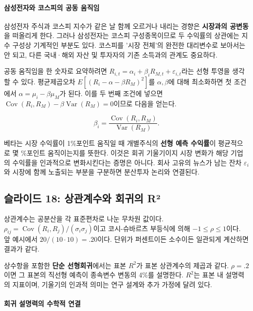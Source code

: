 \documentclass[11pt,a4paper]{article}
\begin{document}
\paragraph{삼성전자와 코스피의 공동 움직임}

삼성전자 주식과 코스피 지수가 같은 날 함께 오르거나 내리는 경향은 \textbf{시장과의 공변동}을 떠올리게 한다. 그러나 삼성전자는 코스피 구성종목이므로 두 수익률의 상관에는 지수 구성상 기계적인 부분도 있다. 코스피를 '시장 전체'의 완전한 대리변수로 보아서는 안 되고, 다른 국내·해외 자산 및 투자자의 기존 소득과의 관계도 중요하다.
\par

공동 움직임을 한 숫자로 요약하려면 $R_{i,t}=\alpha_i+\beta_iR_{M,t}+\varepsilon_{i,t}$라는 선형 투영을 생각할 수 있다. 평균제곱오차 $E[(R_i-\alpha-\beta R_M)^2]$를 $\alpha,\beta$에 대해 최소화하면 첫 조건에서 $\alpha=\mu_i-\beta\mu_M$가 된다. 이를 두 번째 조건에 넣으면 $\operatorname{Cov}(R_i,R_M)-\beta\operatorname{Var}(R_M)=0$이므로 다음을 얻는다.
\par

\[
\beta_i=\frac{\operatorname{Cov}(R_i,R_M)}{\operatorname{Var}(R_M)}.
\]

베타는 시장 수익률이 1\%포인트 움직일 때 개별주식의 \textbf{선형 예측 수익률}이 평균적으로 몇 \%포인트 움직이는지를 뜻한다. 이것은 회귀 기울기이지 시장 변화가 해당 기업의 수익률을 인과적으로 변화시킨다는 증명은 아니다. 회사 고유의 뉴스가 남는 잔차 $\varepsilon_i$와 시장에 함께 노출되는 부분을 구분하면 분산투자 논리와 연결된다.
\par

\subsection{슬라이드 18: 상관계수와 회귀의 R²}

상관계수는 공분산을 각 표준편차로 나눈 무차원 값이다. $\rho_{ij}=\operatorname{Cov}(R_i,R_j)/(\sigma_i\sigma_j)$이고 코시-슈바르츠 부등식에 의해 $-1\le\rho\le1$이다. 앞 예시에서 $20/(10\cdot10)=.20$이다. 단위가 퍼센트이든 소수이든 일관되게 계산하면 결과가 같다.
\par

상수항을 포함한 \textbf{단순 선형회귀}에서는 표본 $R^2$가 표본 상관계수의 제곱과 같다. $\rho=.2$이면 그 표본의 직선형 예측이 종속변수 변동의 4\%를 설명한다. $R^2$는 표본 내 설명력의 지표이며, 기울기의 인과적 의미는 연구 설계와 추가 가정에 달려 있다.
\par

\paragraph{회귀 설명력의 수학적 연결}
\end{document}
